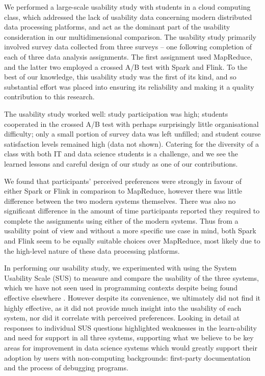   We performed a large-scale usability study with students in a cloud computing class, which addressed the lack of usability data concerning modern distributed data processing platforms, and act as the dominant part of the usability consideration in our multidimensional comparison. The usability study primarily involved survey data collected from three surveys -- one following completion of each of three data analysis assignments. The first assignment used MapReduce, and the latter two employed a crossed A/B test with Spark and Flink. To the best of our knowledge, this usability study was the first of its kind, and so substantial effort was placed into ensuring its reliability and making it a quality contribution to this research.
  
  The usability study worked well: study participation was high; students cooperated in the crossed A/B test with perhaps surprisingly little organisational difficulty; only a small portion of survey data was left unfilled; and student course satisfaction levels remained high (data not shown). Catering for the diversity of a class with both IT and data science students is a challenge, and we see the learned lessons and careful design of our study as one of our contributions.
  
  We found that participants' perceived preferences were strongly in favour of either Spark or Flink in comparison to MapReduce, however there was little difference between the two modern systems themselves. There was also no significant difference in the amount of time participants reported they required to complete the assignments using either of the modern systems. Thus from a usability point of view and without a more specific use case in mind, both Spark and Flink seem to be equally suitable choices over MapReduce, most likely due to the high-level nature of these data processing platforms.
  
  In performing our usability study, we experimented with using the System Usability Scale (SUS) \cite{BROOKE:SUS:1996} to measure and compare the usability of the three systems, which we have not seen used in programming contexts despite being found effective elsewhere \cite{BANGOR:SUS_EVALUATION:2008}. However despite its convenience, we ultimately did not find it highly effective, as it did not provide much insight into the usability of each system, nor did it correlate with perceived preferences. Looking in detail at responses to individual SUS questions highlighted weaknesses in the learn-ability and need for support in all three systems, supporting what we believe to be key areas for improvement in data science systems which would greatly support their adoption by users with non-computing backgrounds: first-party documentation and the process of debugging programs.
  
